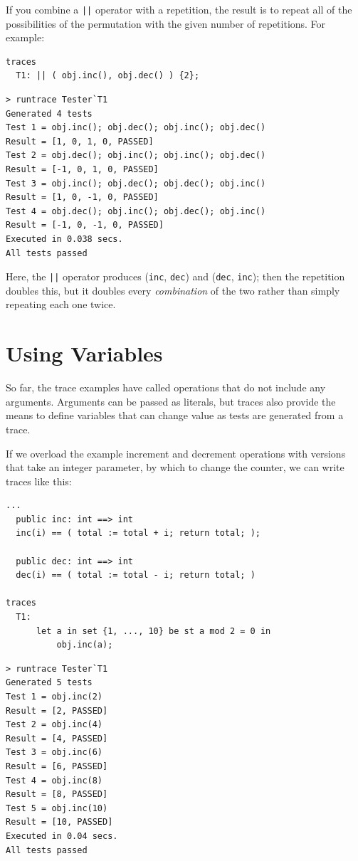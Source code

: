 \documentclass{overturerepchap}
\begin{document}
If you combine a \texttt{||} operator with a repetition, the result is to repeat
all of the possibilities of the permutation with the given number of repetitions.
For example:

\small
\begin{lstlisting}
traces
  T1: || ( obj.inc(), obj.dec() ) {2};
\end{lstlisting}

\lstset{style=tool,language=}
\begin{lstlisting}[escapechar=@]
> runtrace Tester`T1
Generated 4 tests
Test 1 = obj.inc(); obj.dec(); obj.inc(); obj.dec()
Result = [1, 0, 1, 0, PASSED]
Test 2 = obj.dec(); obj.inc(); obj.inc(); obj.dec()
Result = [-1, 0, 1, 0, PASSED]
Test 3 = obj.inc(); obj.dec(); obj.dec(); obj.inc()
Result = [1, 0, -1, 0, PASSED]
Test 4 = obj.dec(); obj.inc(); obj.dec(); obj.inc()
Result = [-1, 0, -1, 0, PASSED]
Executed in 0.038 secs. 
All tests passed
\end{lstlisting}
\lstset{style=mystyle}
\lstset{language=VDM++}
\normalsize

\noindent Here, the \texttt{||} operator produces (\texttt{inc}, \texttt{dec})
and (\texttt{dec}, \texttt{inc}); then the repetition doubles this, but it
doubles every \emph{combination} of the two rather than simply repeating each
one twice.

\section{Using Variables}

So far, the trace examples have called operations that do not include any
arguments. Arguments can be passed as literals, but traces also provide the
means to define variables that can change value as tests are generated from a
trace.

If we overload the example increment and decrement operations with versions that
take an integer parameter, by which to change the counter, we can write traces
like this:

\small
\begin{lstlisting}
...
  public inc: int ==> int
  inc(i) == ( total := total + i; return total; );

  public dec: int ==> int
  dec(i) == ( total := total - i; return total; )

traces
  T1:
      let a in set {1, ..., 10} be st a mod 2 = 0 in
          obj.inc(a);
\end{lstlisting}

\lstset{style=tool,language=}
\begin{lstlisting}[escapechar=@]
> runtrace Tester`T1
Generated 5 tests
Test 1 = obj.inc(2)
Result = [2, PASSED]
Test 2 = obj.inc(4)
Result = [4, PASSED]
Test 3 = obj.inc(6)
Result = [6, PASSED]
Test 4 = obj.inc(8)
Result = [8, PASSED]
Test 5 = obj.inc(10)
Result = [10, PASSED]
Executed in 0.04 secs. 
All tests passed
\end{lstlisting}
\lstset{style=mystyle}
\lstset{language=VDM++}
\normalsize
\end{document}
